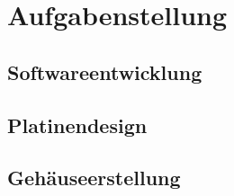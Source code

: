 
\chapter{Aufgabenstellung}
\section{Softwareentwicklung}
\section{Platinendesign}
\section{Gehäuseerstellung}